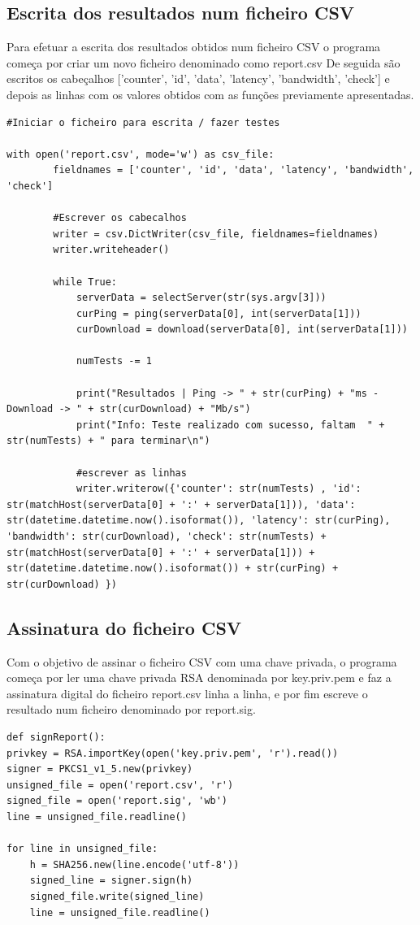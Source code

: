 \documentclass{report}
\begin{document}
\subsection{Escrita dos resultados num ficheiro CSV}
\par Para efetuar a escrita dos resultados obtidos num ficheiro CSV o programa começa por criar um novo ficheiro denominado como report.csv
De seguida são escritos os cabeçalhos ['counter', 'id', 'data', 'latency', 'bandwidth', 'check'] e depois as linhas com os valores obtidos com as funções previamente apresentadas.
\begin{lstlisting}
#Iniciar o ficheiro para escrita / fazer testes

with open('report.csv', mode='w') as csv_file:
        fieldnames = ['counter', 'id', 'data', 'latency', 'bandwidth', 'check']

        #Escrever os cabecalhos
        writer = csv.DictWriter(csv_file, fieldnames=fieldnames)
        writer.writeheader()

        while True:
            serverData = selectServer(str(sys.argv[3]))
            curPing = ping(serverData[0], int(serverData[1]))
            curDownload = download(serverData[0], int(serverData[1]))

            numTests -= 1

            print("Resultados | Ping -> " + str(curPing) + "ms - Download -> " + str(curDownload) + "Mb/s")
            print("Info: Teste realizado com sucesso, faltam  " + str(numTests) + " para terminar\n")
            
            #escrever as linhas
            writer.writerow({'counter': str(numTests) , 'id': str(matchHost(serverData[0] + ':' + serverData[1])), 'data': str(datetime.datetime.now().isoformat()), 'latency': str(curPing), 'bandwidth': str(curDownload), 'check': str(numTests) + str(matchHost(serverData[0] + ':' + serverData[1])) + str(datetime.datetime.now().isoformat()) + str(curPing) + str(curDownload) })
\end{lstlisting}

\subsection{Assinatura do ficheiro CSV}
\par Com o objetivo de assinar o ficheiro CSV com uma chave privada, o programa começa por ler uma chave privada RSA denominada por key.priv.pem e faz a assinatura digital do ficheiro
report.csv linha a linha, e por fim escreve o resultado num ficheiro denominado por report.sig.
\begin{lstlisting}
def signReport():
privkey = RSA.importKey(open('key.priv.pem', 'r').read())
signer = PKCS1_v1_5.new(privkey)
unsigned_file = open('report.csv', 'r')
signed_file = open('report.sig', 'wb')
line = unsigned_file.readline()

for line in unsigned_file:
    h = SHA256.new(line.encode('utf-8'))
    signed_line = signer.sign(h)
    signed_file.write(signed_line)
    line = unsigned_file.readline()
\end{lstlisting}
\end{document}
